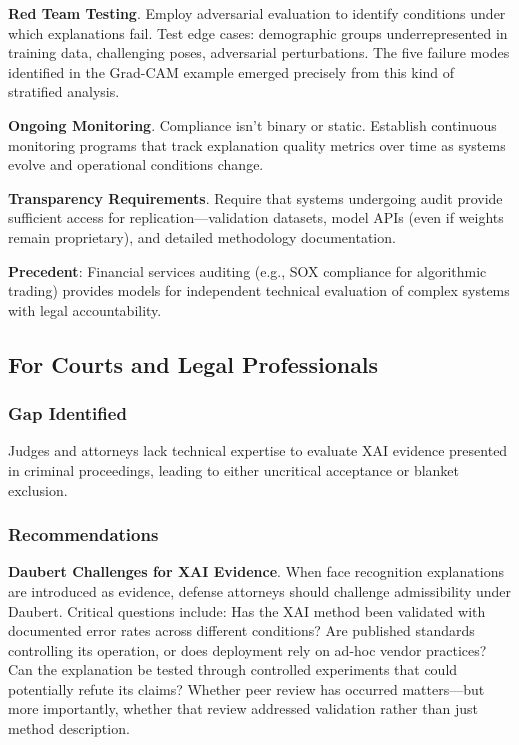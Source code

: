 \textbf{Red Team Testing}. Employ adversarial evaluation to identify conditions under which explanations fail. Test edge cases: demographic groups underrepresented in training data, challenging poses, adversarial perturbations. The five failure modes identified in the Grad-CAM example emerged precisely from this kind of stratified analysis.

\textbf{Ongoing Monitoring}. Compliance isn't binary or static. Establish continuous monitoring programs that track explanation quality metrics over time as systems evolve and operational conditions change.

\textbf{Transparency Requirements}. Require that systems undergoing audit provide sufficient access for replication—validation datasets, model APIs (even if weights remain proprietary), and detailed methodology documentation.

\textbf{Precedent}: Financial services auditing (e.g., SOX compliance for algorithmic trading) provides models for independent technical evaluation of complex systems with legal accountability.

\subsection{For Courts and Legal Professionals}

\subsubsection{Gap Identified}

Judges and attorneys lack technical expertise to evaluate XAI evidence presented in criminal proceedings, leading to either uncritical acceptance or blanket exclusion.

\subsubsection{Recommendations}

\textbf{Daubert Challenges for XAI Evidence}. When face recognition explanations are introduced as evidence, defense attorneys should challenge admissibility under Daubert. Critical questions include: Has the XAI method been validated with documented error rates across different conditions? Are published standards controlling its operation, or does deployment rely on ad-hoc vendor practices? Can the explanation be tested through controlled experiments that could potentially refute its claims? Whether peer review has occurred matters—but more importantly, whether that review addressed validation rather than just method description.

